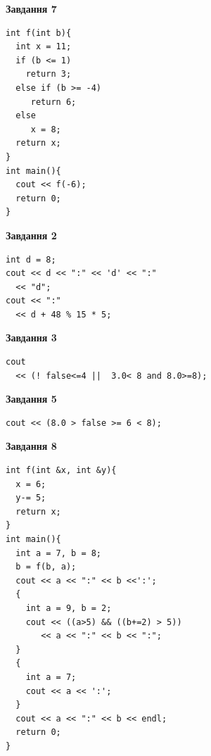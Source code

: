 \documentclass[12pt, ukrainian]{article}
\begin{document}
{\begin {large}
\begin{minipage}[t]{7.0cm}
\begin{center}
\textbf{Завдання 7}
\end{center}
\vspace{-8mm}

\begin{verbatim}
int f(int b){
  int x = 11;
  if (b <= 1)
    return 3;
  else if (b >= -4)
     return 6;
  else
     x = 8;
  return x;
}
int main(){
  cout << f(-6);
  return 0;
}
\end{verbatim}

\end{minipage}
\vline \hspace{1mm}
\begin{minipage}[t]{11.0cm}

\begin{center}
\textbf{Завдання 2}
\end{center}
\vspace{-8mm}

\begin{verbatim}
int d = 8;
cout << d << ":" << 'd' << ":" 
  << "d";
cout << ":" 
  << d + 48 % 15 * 5;
\end{verbatim}



\begin{center}
\textbf{Завдання 3}
\end{center}
\vspace{-8mm}

\begin{verbatim}
cout 
  << (! false<=4 ||  3.0< 8 and 8.0>=8);
\end{verbatim}



\begin{center}
\textbf{Завдання 5}
\end{center}
\vspace{-8mm}

\begin{verbatim}
cout << (8.0 > false >= 6 < 8);
\end{verbatim}



\begin{center}
\textbf{Завдання 8}
\end{center}
\vspace{-8mm}

\begin{verbatim}
int f(int &x, int &y){
  x = 6;
  y-= 5;
  return x;
}
int main(){
  int a = 7, b = 8;
  b = f(b, a);
  cout << a << ":" << b <<':';
  {
    int a = 9, b = 2;
    cout << ((a>5) && ((b+=2) > 5))
       << a << ":" << b << ":";
  }
  {
    int a = 7;
    cout << a << ':';
  }
  cout << a << ":" << b << endl;
  return 0;
}
\end{verbatim}


\end{minipage}
\end{large}}
\end{document}
